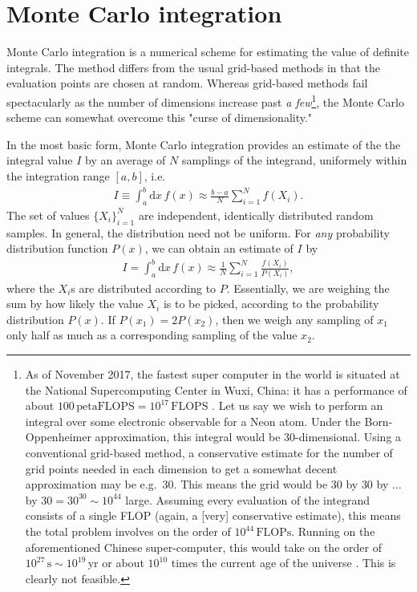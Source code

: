 \documentclass[../../master.tex]{subfiles}
\begin{document}
\section{Monte Carlo integration}
Monte Carlo integration is a numerical scheme for estimating the value of definite integrals. The method differs from the usual grid-based methods in that the evaluation points are chosen at random. Whereas grid-based methods fail spectacularly as the number of dimensions increase past \emph{a few}\footnote{As of November 2017, the fastest super computer in the world is situated at the National Supercomputing Center in Wuxi, China: it has a performance of about $100 \,\text{petaFLOPS}=10^{17}\,\text{FLOPS}$ \cite{top500}. Let us say we wish to perform an integral over some electronic observable for a Neon atom. Under the Born-Oppenheimer approximation, this integral would be $30$-dimensional. Using a conventional grid-based method, a conservative estimate for the number of grid points needed in each dimension to get a somewhat decent approximation may be e.g.\ $30$. This means the grid would be $30$ by $30$ by $\dots$ by $30=30^{30}\sim 10^{44}$ large. Assuming every evaluation of the integrand consists of a single FLOP (again, a [very] conservative estimate), this means the total problem involves on the order of $10^{44}\,\text{FLOPs}$. Running on the aforementioned Chinese super-computer, this would take on the order of $10^{27}\,\text{s}\sim 10^{19}\,\text{yr}$ or about $10^{10}$ times the current age of the universe \cite{hjorth-jensen}. This is clearly not feasible.}, the Monte Carlo scheme can somewhat overcome this "curse of dimensionality." 

In the most basic form, Monte Carlo integration provides an estimate of the the integral value $I$ by an average of $N$ samplings of the integrand, uniformely within the integration range $[a,b]$, i.e.\
\begin{align}
I\equiv \int_a^b\mathrm{d}x\, f(x) \approx \frac{b-a}{N}\sum_{i=1}^N
 f(X_i). \label{eq:mci2}
\end{align}
The set of values $\{X_i\}_{i=1}^N$ are independent, identically distributed random samples. In general, the distribution need not be uniform. For \emph{any} probability distribution function $P(x)$, we can obtain an estimate of $I$ by
\begin{align}
I=\int_a^b\mathrm{d}x\, f(x) \approx \frac{1}{N}\sum_{i=1}^N \frac{f(X_i)}{P(X_i)}, \label{eq:mci1}
\end{align}
where the $X_i$s are distributed according to $P$. Essentially, we are weighing the sum by how likely the value $X_i$ is to be picked, according to the probability distribution $P(x)$. If $P(x_1)=2P(x_2)$, then we weigh any sampling of $x_1$ only half as much as a corresponding sampling of the value $x_2$. 
\end{document}

